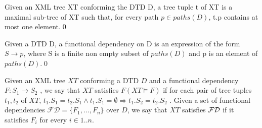 \begin{define}
Given an XML tree XT conforming the DTD D, a tree tuple t of XT is a maximal sub-tree of XT such that, for every path $p \in paths(D)$, t.p contains at most one element.\qed
\end{define}

\begin{define}
Given a DTD D, a functional dependency on D is an expression of the form $S \rightarrow p$, where S is a finite non empty subset of $paths(D)$ and p is an element of $paths(D)$.\qed
\end{define}

Given an XML tree $XT$ conforming a DTD $D$ and a functional dependency $F : S_1 \rightarrow S_2$ , we say that $XT$ satisfies $F (XT \models F )$ if for each pair of tree tuples $t_1, t_2$ of $XT$, $t_1.S_1 = t_2.S_1 \land t_1.S_1 = \emptyset \Rightarrow t_1.S_2 = t_2.S_2$ . Given a set of functional dependencies $\mathcal{FD} = \{F_1 , \dots, F_n\}$ over $D$, we say that $XT$ satisfies $\cal FD$ if it satisfies $F_i$ for every $i \in 1..n$.
